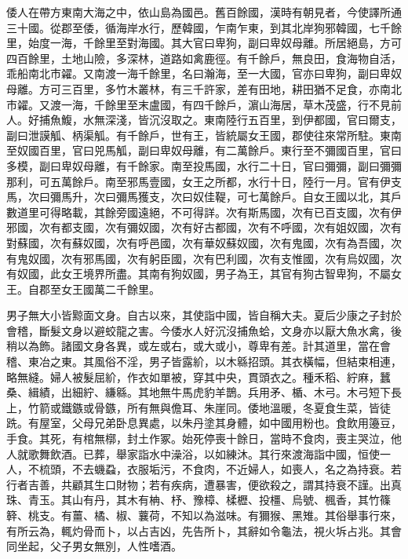 \begin{pinyinscope}
 
 
 倭人在帶方東南大海之中，依山島為國邑。舊百餘國，漢時有朝見者，今使譯所通三十國。從郡至倭，循海岸水行，歷韓國，乍南乍東，到其北岸狗邪韓國，七千餘里，始度一海，千餘里至對海國。其大官曰卑狗，副曰卑奴母離。所居絕島，方可四百餘里，土地山險，多深林，道路如禽鹿徑。有千餘戶，無良田，食海物自活，乖船南北巿糴。又南渡一海千餘里，名曰瀚海，至一大國，官亦曰卑狗，副曰卑奴母離。方可三百里，多竹木叢林，有三千許家，差有田地，耕田猶不足食，亦南北巿糴。又渡一海，千餘里至末盧國，有四千餘戶，濵山海居，草木茂盛，行不見前人。好捕魚鰒，水無深淺，皆沉沒取之。東南陸行五百里，到伊都國，官曰爾支，副曰泄謨觚、柄渠觚。有千餘戶，世有王，皆統屬女王國，郡使往來常所駐。東南至奴國百里，官曰兕馬觚，副曰卑奴母離，有二萬餘戶。東行至不彌國百里，官曰多模，副曰卑奴母離，有千餘家。南至投馬國，水行二十日，官曰彌彌，副曰彌彌那利，可五萬餘戶。南至邪馬壹國，女王之所都，水行十日，陸行一月。官有伊支馬，次曰彌馬升，次曰彌馬獲支，次曰奴佳鞮，可七萬餘戶。自女王國以北，其戶數道里可得略載，其餘旁國遠絕，不可得詳。次有斯馬國，次有已百支國，次有伊邪國，次有都支國，次有彌奴國，次有好古都國，次有不呼國，次有姐奴國，次有對蘇國，次有蘇奴國，次有呼邑國，次有華奴蘇奴國，次有鬼國，次有為吾國，次有鬼奴國，次有邪馬國，次有躬臣國，次有巴利國，次有支惟國，次有烏奴國，次有奴國，此女王境界所盡。其南有狗奴國，男子為王，其官有狗古智卑狗，不屬女王。自郡至女王國萬二千餘里。
 
 
 
 
 男子無大小皆黥面文身。自古以來，其使詣中國，皆自稱大夫。夏后少康之子封於會稽，斷髮文身以避蛟龍之害。今倭水人好沉沒捕魚蛤，文身亦以厭大魚水禽，後稍以為飾。諸國文身各異，或左或右，或大或小，尊卑有差。計其道里，當在會稽、東冶之東。其風俗不淫，男子皆露紒，以木緜招頭。其衣橫幅，但結束相連，略無縫。婦人被髮屈紒，作衣如單被，穿其中央，貫頭衣之。種禾稻、紵麻，蠶桑、緝績，出細紵、縑緜。其地無牛馬虎豹羊鵲。兵用矛、楯、木弓。木弓短下長上，竹箭或鐵鏃或骨鏃，所有無與儋耳、朱崖同。倭地溫暖，冬夏食生菜，皆徒跣。有屋室，父母兄弟卧息異處，以朱丹塗其身體，如中國用粉也。食飲用籩豆，手食。其死，有棺無槨，封土作冢。始死停喪十餘日，當時不食肉，喪主哭泣，他人就歌舞飲酒。已葬，舉家詣水中澡浴，以如練沐。其行來渡海詣中國，恒使一人，不梳頭，不去蟣蝨，衣服垢污，不食肉，不近婦人，如喪人，名之為持衰。若行者吉善，共顧其生口財物；若有疾病，遭暴害，便欲殺之，謂其持衰不謹。出真珠、青玉。其山有丹，其木有柟、杼、豫樟、楺櫪、投橿、烏號、楓香，其竹篠簳、桃支。有薑、橘、椒、蘘荷，不知以為滋味。有獮猴、黑雉。其俗舉事行來，有所云為，輒灼骨而卜，以占吉凶，先告所卜，其辭如令龜法，視火坼占兆。其會同坐起，父子男女無別，人性嗜酒。
 

\end{pinyinscope}
